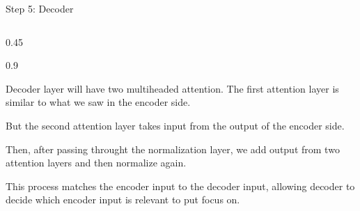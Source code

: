 \documentclass[aspectratio=169,xcolor=dvipsnames,svgnames,x11names,fleqn]{beamer}
\begin{document}
\begin{frame}[fragile]{Step 5: Decoder}
\begin{columns}[T]
        \begin{column}{0.45\textwidth}
            \begin{spacing}{0.9}
                \begin{tcolorbox}[colback=green!5, colframe=green!40!black, title=Architecture, fonttitle=\bfseries\small]
                    \scriptsize Decoder layer will have two multiheaded attention. The first attention layer is similar to what we saw in the encoder side.
                \end{tcolorbox}

                \begin{itemize}
                
                {
                \scriptsize
                
                    \item But the second attention layer takes input from the output of the encoder side.
                    \item  Then, after passing throught the normalization layer, we add output from two attention layers and then normalize again.
                    
                    }
                \end{itemize}

                \begin{tcolorbox}[colback=blue!5, colframe=blue!40, boxrule=0.5pt, fontupper=\scriptsize]
                    This process matches the encoder input to the decoder input, allowing decoder to decide which encoder input is relevant to put focus on.
                \end{tcolorbox}
            \end{spacing}
        \end{column}
    \end{columns}
\end{frame}





\end{document}
